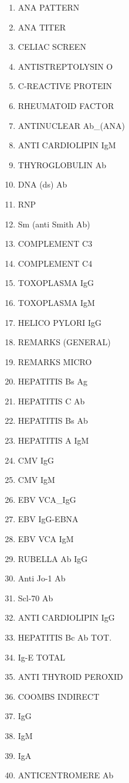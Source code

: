 \documentclass[a4paper,12pt]{article}
\begin{document}
\begin{appendices}
\begin{enumerate}
   			\item ANA PATTERN
   			\item ANA TITER
   			\item CELIAC SCREEN
   			\item ANTISTREPTOLYSIN O
   			\item C-REACTIVE PROTEIN
   			\item RHEUMATOID FACTOR
   			\item ANTINUCLEAR Ab\_(ANA)
   			\item ANTI CARDIOLIPIN IgM
   			\item THYROGLOBULIN Ab
   			\item DNA (ds) Ab
   			\item RNP
   			\item Sm (anti Smith Ab)
   			\item COMPLEMENT C3
   			\item COMPLEMENT C4
   			\item TOXOPLASMA IgG
   			\item TOXOPLASMA IgM
   			\item HELICO PYLORI IgG
   			\item REMARKS (GENERAL)
   			\item REMARKS MICRO
   			\item HEPATITIS Bs Ag
   			\item HEPATITIS C Ab
   			\item HEPATITIS Bs Ab
   			\item HEPATITIS A IgM
   			\item CMV IgG
   			\item CMV IgM
   			\item EBV VCA\_IgG
   			\item EBV IgG-EBNA
   			\item EBV VCA IgM
   			\item RUBELLA Ab IgG
   			\item Anti Jo-1 Ab
   			\item Scl-70 Ab
   			\item ANTI CARDIOLIPIN IgG
   			\item HEPATITIS Bc Ab TOT.
   			\item Ig-E TOTAL
   			\item ANTI THYROID PEROXID
   			\item COOMBS INDIRECT
   			\item IgG
   			\item IgM
   			\item IgA
   			\item ANTICENTROMERE Ab

\end{enumerate}
\end{appendices}
\end{document}
